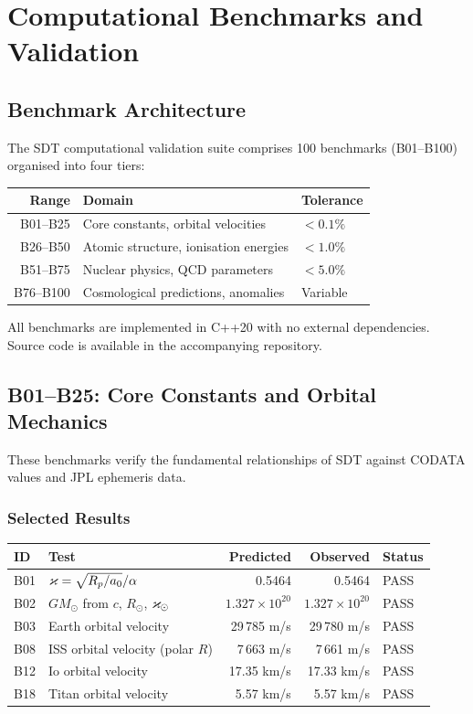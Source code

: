 \chapter{Computational Benchmarks and Validation}
\label{ch:benchmarks}

\section{Benchmark Architecture}

The SDT computational validation suite comprises 100 benchmarks (B01--B100) organised into four tiers:

\begin{center}
\begin{tabular}{rll}
\toprule
\textbf{Range} & \textbf{Domain} & \textbf{Tolerance} \\
\midrule
B01--B25  & Core constants, orbital velocities & $<0.1\%$ \\
B26--B50  & Atomic structure, ionisation energies & $<1.0\%$ \\
B51--B75  & Nuclear physics, QCD parameters & $<5.0\%$ \\
B76--B100 & Cosmological predictions, anomalies & Variable \\
\bottomrule
\end{tabular}
\end{center}

All benchmarks are implemented in C++20 with no external dependencies. Source code is available in the accompanying repository.


\section{B01--B25: Core Constants and Orbital Mechanics}

These benchmarks verify the fundamental relationships of SDT against CODATA values and JPL ephemeris data.

\subsection{Selected Results}

\begin{center}
\small
\begin{tabular}{llrrl}
\toprule
\textbf{ID} & \textbf{Test} & \textbf{Predicted} & \textbf{Observed} & \textbf{Status} \\
\midrule
B01 & $\varkappa = \sqrt{R_p/a_0}/\alpha$ & 0.5464 & 0.5464 & PASS \\
B02 & $GM_\odot$ from $c$, $R_\odot$, $\varkappa_\odot$ & $1.327 \times 10^{20}$ & $1.327 \times 10^{20}$ & PASS \\
B03 & Earth orbital velocity & 29\,785 m/s & 29\,780 m/s & PASS \\
B08 & ISS orbital velocity (polar $R$) & 7\,663 m/s & 7\,661 m/s & PASS \\
B12 & Io orbital velocity & 17.35 km/s & 17.33 km/s & PASS \\
B18 & Titan orbital velocity & 5.57 km/s & 5.57 km/s & PASS \\
\bottomrule
\end{tabular}
\end{center}


